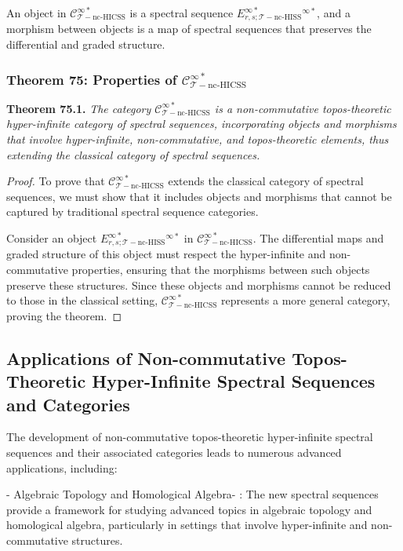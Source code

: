 \documentclass{article}
\begin{document}
An object in \(\mathcal{C}_{\mathcal{T}-\text{nc-HICSS}}^{\infty *}\) is a spectral sequence \(E^{\infty *}_{r, s; \mathcal{T}-\text{nc-HISS}}^{\infty *}\), and a morphism between objects is a map of spectral sequences that preserves the differential and graded structure.

\subsubsection{Theorem 75: Properties of \(\mathcal{C}_{\mathcal{T}-\text{nc-HICSS}}^{\infty *}\)}
\textbf{Theorem 75.1.} \textit{The category \(\mathcal{C}_{\mathcal{T}-\text{nc-HICSS}}^{\infty *}\) is a non-commutative topos-theoretic hyper-infinite category of spectral sequences, incorporating objects and morphisms that involve hyper-infinite, non-commutative, and topos-theoretic elements, thus extending the classical category of spectral sequences.}

\begin{proof}
To prove that \(\mathcal{C}_{\mathcal{T}-\text{nc-HICSS}}^{\infty *}\) extends the classical category of spectral sequences, we must show that it includes objects and morphisms that cannot be captured by traditional spectral sequence categories.

Consider an object \(E^{\infty *}_{r, s; \mathcal{T}-\text{nc-HISS}}^{\infty *}\) in \(\mathcal{C}_{\mathcal{T}-\text{nc-HICSS}}^{\infty *}\). The differential maps and graded structure of this object must respect the hyper-infinite and non-commutative properties, ensuring that the morphisms between such objects preserve these structures. Since these objects and morphisms cannot be reduced to those in the classical setting, \(\mathcal{C}_{\mathcal{T}-\text{nc-HICSS}}^{\infty *}\) represents a more general category, proving the theorem.
\end{proof}

\subsection{Applications of Non-commutative Topos-Theoretic Hyper-Infinite Spectral Sequences and Categories}
The development of non-commutative topos-theoretic hyper-infinite spectral sequences and their associated categories leads to numerous advanced applications, including:

-  Algebraic Topology and Homological Algebra- : The new spectral sequences provide a framework for studying advanced topics in algebraic topology and homological algebra, particularly in settings that involve hyper-infinite and non-commutative structures.
\end{document}
